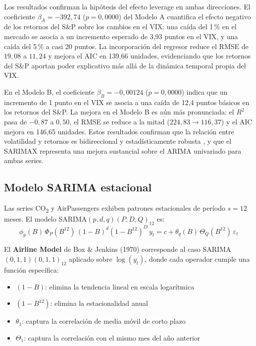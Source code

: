 \documentclass[12pt, a4paper]{article}
\begin{document}
Los resultados confirman la hipótesis del efecto leverage en ambas direcciones. El coeficiente $\beta_A = -392{,}74$ ($p = 0{,}0000$) del Modelo A cuantifica el efecto negativo de los retornos del S\&P sobre los cambios en el VIX: una caída del 1\,\% en el mercado se asocia a un incremento esperado de 3{,}93 puntos en el VIX, y una caída del 5\,\% a casi 20 puntos. La incorporación del regresor reduce el RMSE de $19{,}08$ a $11{,}24$ y mejora el AIC en 139{,}66 unidades, evidenciando que los retornos del S\&P aportan poder explicativo más allá de la dinámica temporal propia del VIX.

En el Modelo B, el coeficiente $\beta_B = -0{,}00124$ ($p = 0{,}0000$) indica que un incremento de 1 punto en el VIX se asocia a una caída de 12{,}4 puntos básicos en los retornos del S\&P. La mejora en el Modelo B es aún más pronunciada: el $R^2$ pasa de $-0{,}87$ a $0{,}50$, el RMSE se reduce a la mitad ($224{,}83 \to 116{,}37$) y el AIC mejora en 146{,}65 unidades. Estos resultados confirman que la relación entre volatilidad y retornos es bidireccional y estadísticamente robusta \cite{tsay2005}, y que el SARIMAX representa una mejora sustancial sobre el ARIMA univariado para ambas series.

\subsection{Modelo SARIMA estacional}
\label{subsec:sarima_estacional}

Las series CO\textsubscript{2} y AirPassengers exhiben patrones estacionales de período $s = 12$ meses. El modelo SARIMA$(p,d,q)(P,D,Q)_{12}$ es:
$$\phi_p(B)\,\Phi_P(B^{12})\,(1-B)^d(1-B^{12})^D\, y_t = c + \theta_q(B)\,\Theta_Q(B^{12})\,\varepsilon_t$$

El \textbf{Airline Model} de Box \& Jenkins (1970) corresponde al caso SARIMA$(0,1,1)(0,1,1)_{12}$ aplicado sobre $\log(y_t)$, donde cada operador cumple una función específica:
\begin{itemize}
    \item $(1-B)$: elimina la tendencia lineal en escala logarítmica
    \item $(1-B^{12})$: elimina la estacionalidad anual
    \item $\theta_1$: captura la correlación de media móvil de corto plazo
    \item $\Theta_1$: captura la correlación con el mismo mes del año anterior
\end{itemize}
\end{document}
